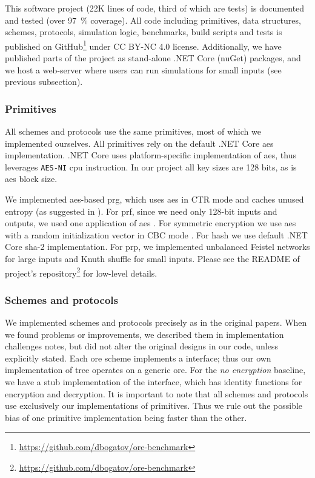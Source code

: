 		This software project (22K lines of code, third of which are tests) is documented and tested (over \SI{97}{\percent} coverage).
		All code including primitives, data structures, schemes, protocols, simulation logic, benchmarks, build scripts and tests is published on GitHub\footnote{\url{https://github.com/dbogatov/ore-benchmark}} under CC BY-NC 4.0 license.
		Additionally, we have published parts of the project as stand-alone {.NET Core} (nuGet) packages, and we host a web-server where users can run simulations for small inputs (see previous subsection).

		\subsubsection{Primitives}

			All schemes and protocols use the same primitives, most of which we implemented ourselves.
			All primitives rely on the default {.NET Core} \acrshort{aes} implementation.
			{.NET Core} uses platform-specific implementation of \acrshort{aes}, thus leverages \texttt{AES-NI} \acrshort{cpu} instruction.
			In our project all key sizes are 128 bits, as is \acrshort{aes} block size.

			We implemented \acrshort{aes}-based \acrshort{prg}, which uses \acrshort{aes} \cite{aes-nist} in CTR mode \cite{nist-modes} and caches unused entropy (as suggested in \cite{aes-ctr-rfc}).
			For \acrshort{prf}, since we need only 128-bit inputs and outputs, we used one application of \acrshort{aes} \cite[Proposition 3.27]{intro-to-modern-crypto}.
			For symmetric encryption we use \acrshort{aes} with a random initialization vector in CBC mode \cite[Section 3.6.2]{intro-to-modern-crypto}.
			For hash we use default {.NET Core} \acrshort{sha}-2 implementation.
			For \acrshort{prp}, we implemented unbalanced Feistel networks \cite{unbalanced-feistel} for large inputs and Knuth shuffle \cite{knuth-shuffle} for small inputs.
			Please see the README of project's repository\footnote{\url{https://github.com/dbogatov/ore-benchmark}} for low-level details.

			

		\subsubsection{Schemes and protocols}

			We implemented schemes and protocols precisely as in the original papers.
			When we found problems or improvements, we described them in implementation challenges notes, but did not alter the original designs in our code, unless explicitly stated.
			Each \acrshort{ore} scheme implements a {\Csharp} interface; thus our own implementation of {\BPlus} tree operates on a generic \acrshort{ore}.
			For the \emph{no encryption} baseline, we have a stub implementation of the interface, which has identity functions for encryption and decryption.
			It is important to note that all schemes and protocols use exclusively our implementations of primitives.
			Thus we rule out the possible bias of one primitive implementation being faster than the other.

